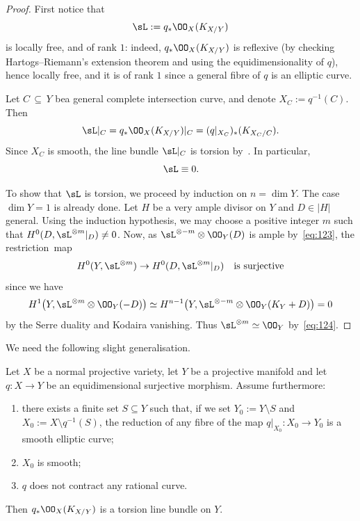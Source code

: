 \begin{proof}
First notice that
\[
\sL := q_*\OO_X(K_{X/Y})
\]
is locally free, and of rank $1$: indeed, $ q_*\OO_X(K_{X/Y}) $ is reflexive (by checking Hartogs--Riemann's extension theorem and using the equidimensionality of $q$), hence locally free, and it is of rank $1$ since a general fibre of $q$ is an elliptic curve.

Let $C\,\subseteq\,Y$ bea general complete intersection curve, and denote $X_C:=q^{-1}(C)$. Then
\[
\sL|_C = q_*\OO_X(K_{X/Y})|_C = (q|_{X_C})_*(K_{X_C/C}).
\]
Since $X_C$ is smooth, the line bundle $\sL|_C$ is torsion by~\cite[Theorem~III.18.3]{BHPV04}. In particular,
\begin{equation}\label{eq:123}
\sL \equiv 0.
\end{equation}

To show that $\sL$ is torsion, we proceed by induction on $n=\dim Y$. The case $\dim Y = 1$ is already done. Let $H$ be a very ample divisor on $Y$ and $D \in | H |$ general. Using the induction hypothesis, we may choose a positive integer $m$ such that $H^0(D, \sL^{\otimes m}|_D) \ne 0$. Now, as $\sL^{\otimes -m} \otimes \OO_Y(D)$ is ample by~\eqref{eq:123}, the restriction~map
\begin{equation}\label{eq:124}
H^0(Y,\sL^{\otimes m}) \to H^0(D, \sL^{\otimes m}|_D)\quad\text{is surjective}
\end{equation}
since we have
\[
H^1\big(Y,\sL^{\otimes m} \otimes \OO_Y(-D)\big)\simeq H^{n-1}\big(Y, \sL^{\otimes -m} \otimes \OO_Y(K_Y+D)\big) = 0
\]
by the Serre duality and Kodaira vanishing. Thus $\sL^{\otimes m} \simeq \OO_Y$ by~\eqref{eq:124}.
\end{proof}

We need the following slight generalisation.

\begin{lemm}\label{lem:flat-elliptic}
Let $X$ be a normal projective variety, let $Y$ be a projective manifold and let $q\colon X \to Y$ be an equidimensional surjective morphism. Assume furthermore:
\begin{enumerate}
\item \label{list-6.4.1} there exists a finite set $S \subseteq Y$ such that, if we set $Y_0:=Y \setminus S$ and $X_0:=X \setminus q^{-1}(S)$, the reduction of any fibre of the map $q|_{X_0}\colon X_0 \to Y_0$ is a smooth elliptic curve;
\item \label{list-6.4.2}$X_0$ is smooth;
\item \label{list-6.4.3}$q$ does not contract any rational curve.
\end{enumerate}
Then $q_*\OO_X({K_{X/Y}})$ is a torsion line bundle on $Y$.
\end{lemm}

